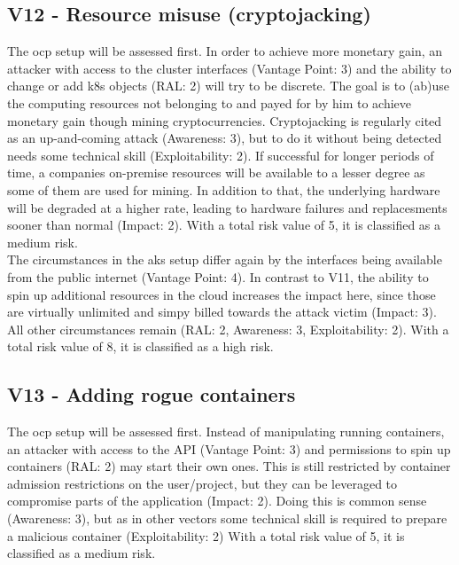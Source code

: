 \subsection{V12 - Resource misuse (cryptojacking)}

The \gls{ocp} setup will be assessed first.
In order to achieve more monetary gain, an attacker with access to the cluster interfaces (Vantage Point: 3) and the ability to change or add \gls{k8s} objects (RAL: 2) will try to be discrete. 
The goal is to (ab)use the computing resources not belonging to and payed for by him to achieve monetary gain though mining cryptocurrencies.
Cryptojacking is regularly cited as an up-and-coming attack (Awareness: 3), but to do it without being detected needs some technical skill (Exploitability: 2).
If successful for longer periods of time, a companies on-premise resources will be available to a lesser degree as some of them are used for mining. In addition to that, the underlying hardware will be degraded at a higher rate, leading to hardware failures and replacesments sooner than normal (Impact: 2).
With a total risk value of 5, it is classified as a medium risk. \\


The circumstances in the \gls{aks} setup differ again by the interfaces being available from the public internet (Vantage Point: 4).
In contrast to V11, the ability to spin up additional resources in the cloud increases the impact here, since those are virtually unlimited and simpy billed towards the attack victim (Impact: 3).
All other circumstances remain (RAL: 2, Awareness: 3, Exploitability: 2).
With a total risk value of 8, it is classified as a high risk.

\subsection{V13 - Adding rogue containers}

The \gls{ocp} setup will be assessed first.
Instead of manipulating running containers, an attacker with access to the API (Vantage Point: 3) and permissions to spin up containers (RAL: 2) may start their own ones. 
This is still restricted by container admission restrictions on the user/project, but they can be leveraged to compromise parts of the application (Impact: 2).
Doing this is common sense (Awareness: 3), but as in other vectors some technical skill is required to prepare a malicious container (Exploitability: 2)
With a total risk value of 5, it is classified as a medium risk. \\


